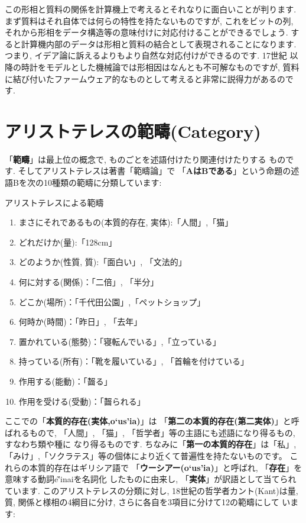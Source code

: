 この形相と質料の関係を計算機上で考えるとそれなりに面白いことが判ります.
 まず質料はそれ自体では何らの特性を持たないものですが, これをビットの列,
それから形相をデータ構造等の意味付けに対応付けることができるでしょう.
 すると計算機内部のデータは形相と質料の結合として表現されることになります.
 つまり, イデア論に訴えるよりもより自然な対応付けができるのです. 17世紀
以降の時計をモデルとした機械論では形相因はなんとも不可解なものですが, 質料
に結び付いたファームウェア的なものとして考えると非常に説得力があるのです.


\section{アリストテレスの範疇(Category)}


「\textbf{範疇}」は最上位の概念で, ものごとを述語付けたり関連付けたりする
ものです. そしてアリストテレスは著書「範疇論」\cite{アリストテレス1}で
「\textbf{AはBである}」という命題の述語Bを次の10種類の範疇に分類しています:


\begin{itembox}[c]{{アリストテレスによる範疇}}
{\footnotesize
\begin{enumerate}
\item{まさにそれであるもの(本質的存在, 実体):「人間」,「猫」}
\item{どれだけか(量):「128cm」}
\item{どのようか(性質, 質):「面白い」, 「文法的」}
\item{何に対する(関係)：「二倍」, 「半分」}
\item{どこか(場所)：「千代田公園」,「ペットショップ」}
\item{何時か(時間)：「昨日」, 「去年」}
\item{置かれている(態勢)：「寝転んでいる」,「立っている」}
\item{持っている(所有)：「靴を履いている」, 「首輪を付けている」}
\item{作用する(能動)：「齧る」}
\item{作用を受ける(受動)：「齧られる」}
\end{enumerate}
}
\end{itembox}


ここでの「\textbf{本質的存在(実体,\textgreek{o`us'ia})}」は
「\textbf{第二の本質的存在(第二実体)}」と呼ばれるもので, 「人間」,
「猫」, 「哲学者」等の主語にも述語になり得るもの, すなわち類や種に
なり得るものです. ちなみに「\textbf{第一の本質的存在}」は「私」,
「みけ」,「ソクラテス」等の個体により近くて普遍性を持たないものです。
 これらの本質的存在はギリシア語で
 「\textbf{ウーシアー(\textgreek{o`us'ia})}」と呼ばれ, 
「\textbf{存在}」を意味する動詞\textgreek{e\~{'i}nai}を名詞化
したものに由来し, 「\textbf{実体}」が訳語として当てられています.
このアリストテレスの分類に対し, 18世紀の哲学者カント(Kant)は量, 質,
 関係と様相の4綱目に分け, さらに各自を3項目に分けて12の範疇にして
います\cite{藤野}:


